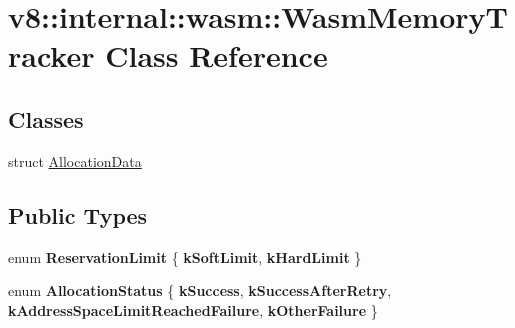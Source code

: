 \hypertarget{classv8_1_1internal_1_1wasm_1_1WasmMemoryTracker}{}\section{v8\+:\+:internal\+:\+:wasm\+:\+:Wasm\+Memory\+Tracker Class Reference}
\label{classv8_1_1internal_1_1wasm_1_1WasmMemoryTracker}
\subsection*{Classes}
\begin{DoxyCompactItemize}
\item 
struct \mbox{\hyperlink{structv8_1_1internal_1_1wasm_1_1WasmMemoryTracker_1_1AllocationData}{Allocation\+Data}}
\end{DoxyCompactItemize}
\subsection*{Public Types}
\begin{DoxyCompactItemize}
\item 
\mbox{\label{classv8_1_1internal_1_1wasm_1_1WasmMemoryTracker_a27679a5baca8c8e4d21a00bb308a3958}} 
enum {\bfseries Reservation\+Limit} \{ {\bfseries k\+Soft\+Limit}, 
{\bfseries k\+Hard\+Limit}
 \}
\item 
\mbox{\label{classv8_1_1internal_1_1wasm_1_1WasmMemoryTracker_ab69c14121ba67188237962cb5869f054}} 
enum {\bfseries Allocation\+Status} \{ {\bfseries k\+Success}, 
{\bfseries k\+Success\+After\+Retry}, 
{\bfseries k\+Address\+Space\+Limit\+Reached\+Failure}, 
{\bfseries k\+Other\+Failure}
 \}
\end{DoxyCompactItemize}
